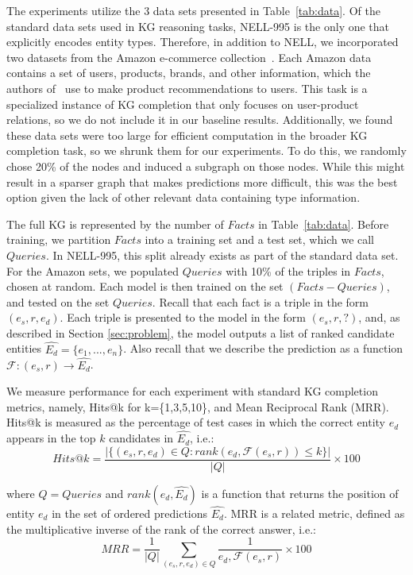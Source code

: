 The experiments utilize the 3 data sets presented in Table~\ref{tab:data}.
Of the standard data sets used in KG reasoning tasks, NELL-995 is the only one that explicitly encodes entity types. Therefore, in addition to NELL, we incorporated two datasets from the Amazon e-commerce collection~\cite{he2016ups}. Each Amazon data contains a set of users, products, brands, and other information, which the authors of~\cite{xian2019reinforcement} use to make product recommendations to users. This task is a specialized instance of KG completion that only focuses on user-product relations, so we do not include it in our baseline results. Additionally, we found these data sets were too large for efficient computation in the broader KG completion task, so we shrunk them for our experiments. To do this, we randomly chose 20\% of the nodes and induced a subgraph on those nodes. While this might result in a sparser graph that makes predictions more difficult, this was the best option given the lack of other relevant data containing type information.

The full KG is represented by the number of $Facts$ in Table~\ref{tab:data}. Before training, we partition $Facts$ into a training set and a test set, which we call $Queries$. In NELL-995, this split already exists as part of the standard data set. For the Amazon sets, we populated $Queries$ with 10\% of the triples in $Facts$, chosen at random. Each model is then trained on the set $(Facts - Queries)$, and tested on the set $Queries$. Recall that each fact is a triple in the form $(e_s, r, e_d)$. Each triple is presented to the model in the form $(e_s, r, ?)$, and, as described in Section \ref{sec:problem}, the model outputs a list of ranked candidate entities $\hat{E_d} = \{e_1, ..., e_n\}$. Also recall that we describe the prediction as a function $\mathcal{F}: (e_s, r) \rightarrow \hat{E_d}$.

We measure performance for each experiment with standard KG completion metrics, namely, Hits@k for k=\{1,3,5,10\}, and Mean Reciprocal Rank (MRR). Hits@k is measured as the percentage of test cases in which the correct entity $e_d$ appears in the top $k$ candidates in $\hat{E_d}$, i.e.:
\begin{equation}
    Hits@k = \frac{|\{(e_s, r, e_d) \in Q : rank(e_d, \mathcal{F}(e_s, r)) \leq k\}|}{|Q|} \times 100
\end{equation}

where $Q = Queries$ and $rank(e_d, \hat{E_d})$ is a function that returns the position of entity $e_d$ in the set of ordered predictions $\hat{E_d}$. MRR is a related metric, defined as the multiplicative inverse of the rank of the correct answer, i.e.:
\begin{equation}
    MRR = \frac{1}{|Q|}\sum_{(e_s, r, e_d) \in Q}{\frac{1}{e_d, \mathcal{F}(e_s, r)}} \times 100
\end{equation}

